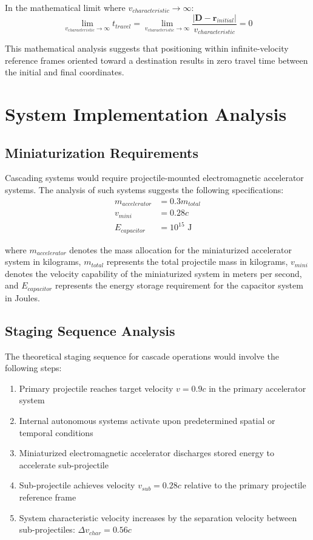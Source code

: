 \documentclass[12pt,a4paper]{article}
\begin{document}
In the mathematical limit where $v_{characteristic} \to \infty$:
\begin{equation}
\lim_{v_{characteristic} \to \infty} t_{travel} = \lim_{v_{characteristic} \to \infty} \frac{|\mathbf{D} - \mathbf{r}_{initial}|}{v_{characteristic}} = 0
\end{equation}

This mathematical analysis suggests that positioning within infinite-velocity reference frames oriented toward a destination results in zero travel time between the initial and final coordinates.

\section{System Implementation Analysis}

\subsection{Miniaturization Requirements}

Cascading systems would require projectile-mounted electromagnetic accelerator systems. The analysis of such systems suggests the following specifications:
\begin{align}
m_{accelerator} &= 0.3m_{total} \\
v_{mini} &= 0.28c \\
E_{capacitor} &= 10^{15} \text{ J}
\end{align}

where $m_{accelerator}$ denotes the mass allocation for the miniaturized accelerator system in kilograms, $m_{total}$ represents the total projectile mass in kilograms, $v_{mini}$ denotes the velocity capability of the miniaturized system in meters per second, and $E_{capacitor}$ represents the energy storage requirement for the capacitor system in Joules.

\subsection{Staging Sequence Analysis}

The theoretical staging sequence for cascade operations would involve the following steps:
\begin{enumerate}
\item Primary projectile reaches target velocity $v = 0.9c$ in the primary accelerator system
\item Internal autonomous systems activate upon predetermined spatial or temporal conditions
\item Miniaturized electromagnetic accelerator discharges stored energy to accelerate sub-projectile
\item Sub-projectile achieves velocity $v_{sub} = 0.28c$ relative to the primary projectile reference frame
\item System characteristic velocity increases by the separation velocity between sub-projectiles: $\Delta v_{char} = 0.56c$
\end{enumerate}
\end{document}
